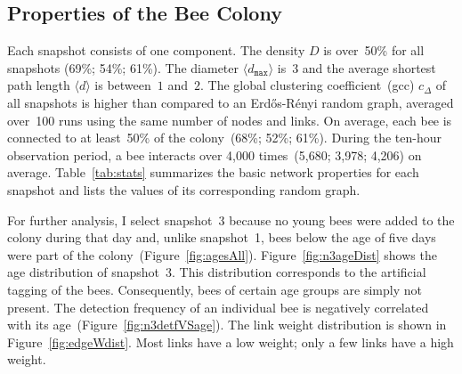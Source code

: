 \subsection{Properties of the Bee Colony}
\label{subsec:colony}
Each snapshot consists of one component.
The density $D$ is over~50\% for all snapshots (69\%; 54\%; 61\%).
The diameter $\langle d_{\texttt{max}} \rangle$ is~$3$ and the average shortest path length $\langle d \rangle$ is between~$1$ and~$2$.
The global clustering coefficient~(gcc) $c_\Delta$ of all snapshots is higher than compared to an Erd\H{o}s-R\'{e}nyi random graph, averaged over~100 runs using the same number of nodes and links.
On average, each bee is connected to at least~50\% of the colony~(68\%; 52\%; 61\%).
During the ten-hour observation period, a bee interacts over 4,000 times~(5,680; 3,978; 4,206) on average.
Table~\ref{tab:stats} summarizes the basic network properties for each snapshot and lists the values of its corresponding random graph.

For further analysis, I select snapshot~3 because no young bees were added to the colony during that day and, unlike snapshot~1, bees below the age of five days were part of the colony~(Figure~\ref{fig:agesAll}).
Figure~\ref{fig:n3ageDist} shows the age distribution of snapshot~3.
This distribution corresponds to the artificial tagging of the bees.
Consequently, bees of certain age groups are simply not present.
The detection frequency of an individual bee is negatively correlated with its age~(Figure~\ref{fig:n3detfVSage}).
The link weight distribution is shown in Figure~\ref{fig:edgeWdist}.
Most links have a low weight; only a few links have a high weight.



